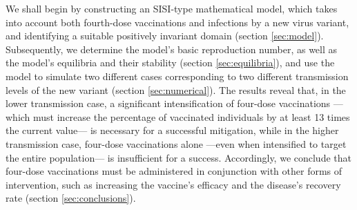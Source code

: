 \documentclass[11pt,reqno]{amsart}
\begin{document}
We shall begin by constructing an SISI-type mathematical model, which takes into account both fourth-dose vaccinations and infections by a new virus variant, and identifying a suitable positively invariant domain (section \ref{sec:model}). Subsequently, we determine the model's basic reproduction number, as well as the model's equilibria and their stability (section \ref{sec:equilibria}), and use the model to simulate two different cases corresponding to two different transmission levels of the new variant (section \ref{sec:numerical}). The results reveal that, in the lower transmission case, a significant intensification of four-dose vaccinations ---which must increase the percentage of vaccinated individuals by at least 13 times the current value--- is necessary for a successful mitigation, while in the higher transmission case, four-dose vaccinations alone ---even when intensified to target the entire population--- is insufficient for a success. Accordingly, we conclude that four-dose vaccinations must be administered in conjunction with other forms of intervention, such as increasing the vaccine's efficacy and the disease's recovery rate (section \ref{sec:conclusions}).




\end{document}
